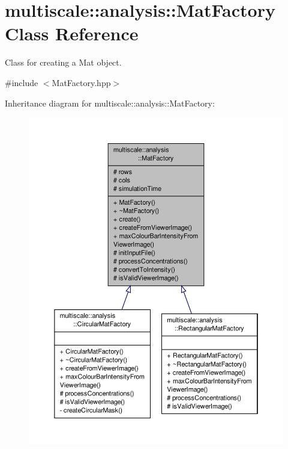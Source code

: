 \hypertarget{classmultiscale_1_1analysis_1_1MatFactory}{\section{multiscale\-:\-:analysis\-:\-:Mat\-Factory Class Reference}
\label{classmultiscale_1_1analysis_1_1MatFactory}
}


Class for creating a Mat object.  




{\ttfamily \#include $<$Mat\-Factory.\-hpp$>$}



Inheritance diagram for multiscale\-:\-:analysis\-:\-:Mat\-Factory\-:\nopagebreak
\begin{figure}[H]
\begin{center}
\leavevmode
\includegraphics[width=350pt]{classmultiscale_1_1analysis_1_1MatFactory__inherit__graph}
\end{center}
\end{figure}


